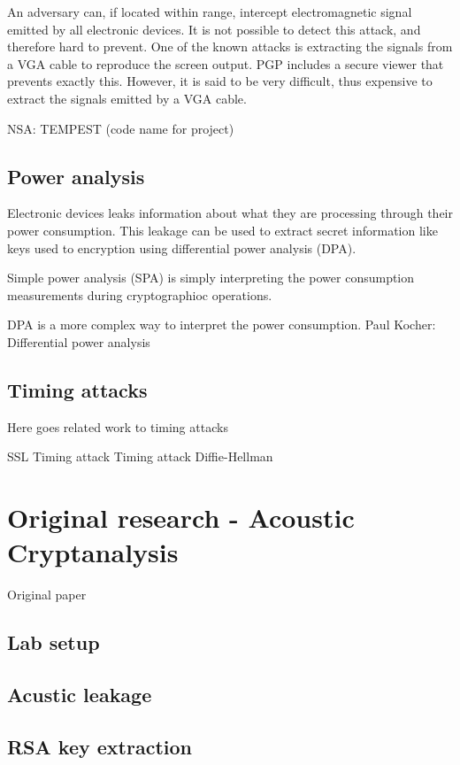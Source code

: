 An adversary can, if located within range, intercept electromagnetic signal emitted by all electronic devices. 
It is not possible to detect this attack, and therefore hard to prevent. 
One of the known attacks is extracting the signals from a VGA cable to reproduce the screen output.
PGP includes a secure viewer that prevents exactly this. 
However, it is said to be very difficult, thus expensive to extract the signals emitted by a VGA cable. 

NSA: TEMPEST (code name for project)

\subsection{Power analysis}\label{sec:power_analysis}

Electronic devices leaks information about what they are processing through their power consumption.
This leakage can be used to extract secret information like keys used to encryption using differential power analysis (DPA). 

Simple power analysis (SPA) is simply interpreting the power consumption measurements during cryptographioc operations\cite{dpa_kocher}. 

DPA is a more complex way to interpret the power consumption. 
Paul Kocher: Differential power analysis \cite{dpa_kocher}

\subsection{Timing attacks}\label{sec:timing_attacks}

Here goes related work to timing attacks

SSL Timing attack \cite{ssl_timing_attack}
Timing attack Diffie-Hellman \cite{timing_attack_kocher}

\section{Original research - Acoustic Cryptanalysis}\label{sec:original_research}

Original paper \cite{original_paper}

\subsection{Lab setup}\label{sec:lab_setup}
\subsection{Acustic leakage}\label{sec:acustic_leakage}
\subsection{RSA key extraction}\label{sec:rsa_key_extraction}
